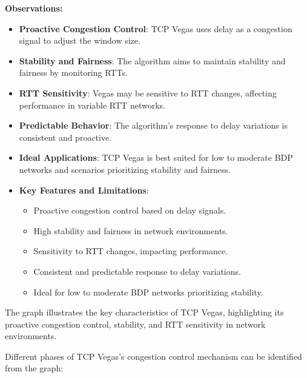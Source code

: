 \documentclass[11pt,a4paper]{article}
\begin{document}
\textbf{Observations:}
\begin{itemize}
    \item \textbf{Proactive Congestion Control}: TCP Vegas uses delay as a congestion signal to adjust the window size.
    \item \textbf{Stability and Fairness}: The algorithm aims to maintain stability and fairness by monitoring RTTs.
    \item \textbf{RTT Sensitivity}: Vegas may be sensitive to RTT changes, affecting performance in variable RTT networks.
    \item \textbf{Predictable Behavior}: The algorithm's response to delay variations is consistent and proactive.
    \item \textbf{Ideal Applications}: TCP Vegas is best suited for low to moderate BDP networks and scenarios prioritizing stability and fairness.
    \item   \textbf{Key Features and Limitations}: {
        \begin{itemize}
            \item Proactive congestion control based on delay signals.
            \item High stability and fairness in network environments.
            \item Sensitivity to RTT changes, impacting performance.
            \item Consistent and predictable response to delay variations.
            \item Ideal for low to moderate BDP networks prioritizing stability.
        \end{itemize}
    }
\end{itemize}

The graph illustrates the key characteristics of TCP Vegas, highlighting its proactive congestion control, stability, and RTT sensitivity in network environments.

Different phases of TCP Vegas's congestion control mechanism can be identified from the graph:
\end{document}
